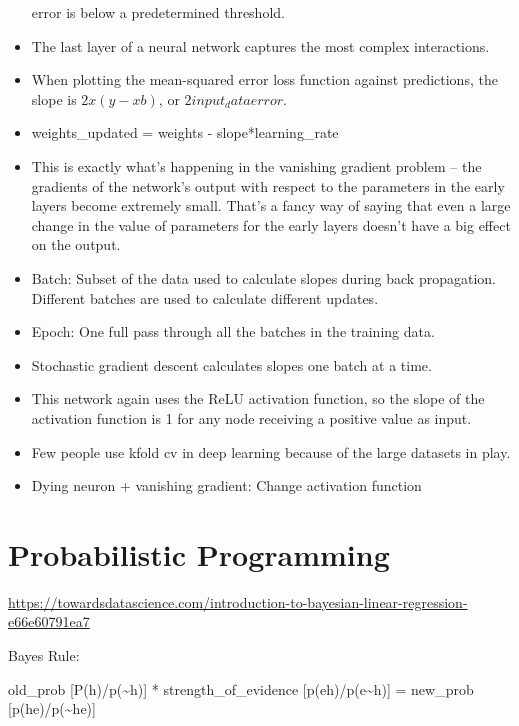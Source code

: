 \documentclass[]{book}
\theoremstyle{definition}
\theoremstyle{definition}
\theoremstyle{definition}
\theoremstyle{remark}
\begin{document}
\begin{itemize}
  error is below a predetermined threshold.
\item
  The last layer of a neural network captures the most complex
  interactions.
\item
  When plotting the mean-squared error loss function against
  predictions, the slope is \(2x(y-xb)\), or \(2input_data error\).
\item
  weights\_updated = weights - slope*learning\_rate
\item
  This is exactly what's happening in the vanishing gradient problem --
  the gradients of the network's output with respect to the parameters
  in the early layers become extremely small. That's a fancy way of
  saying that even a large change in the value of parameters for the
  early layers doesn't have a big effect on the output.
\item
  Batch: Subset of the data used to calculate slopes during back
  propagation. Different batches are used to calculate different
  updates.
\item
  Epoch: One full pass through all the batches in the training data.
\item
  Stochastic gradient descent calculates slopes one batch at a time.
\item
  This network again uses the ReLU activation function, so the slope of
  the activation function is 1 for any node receiving a positive value
  as input.
\item
  Few people use kfold cv in deep learning because of the large datasets
  in play.
\item
  Dying neuron + vanishing gradient: Change activation function
\end{itemize}

\chapter{Probabilistic Programming}\label{probabilistic-programming}

\url{https://towardsdatascience.com/introduction-to-bayesian-linear-regression-e66e60791ea7}

Bayes Rule:

old\_prob {[}P(h)/p(\textasciitilde{}h){]} * strength\_of\_evidence
{[}p(e\textbar{}h)/p(e\textbar{}\textasciitilde{}h){]} = new\_prob
{[}p(h\textbar{}e)/p(\textasciitilde{}h\textbar{}e){]}
\end{document}
